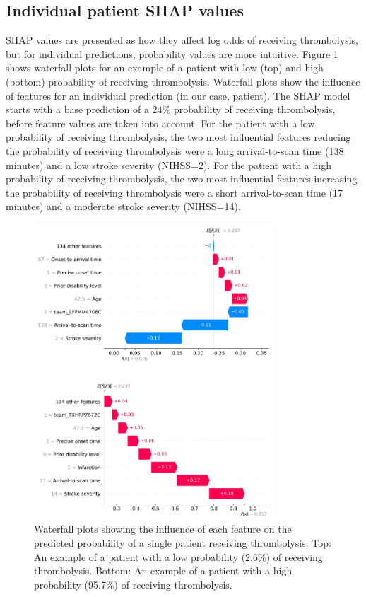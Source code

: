 \subsection{Individual patient SHAP values}
SHAP values are presented as how they affect log odds of receiving thrombolysis, but for individual predictions, probability values are more intuitive. Figure \ref{fig:results_waterfall} shows waterfall plots for an example of a patient with low (top) and high (bottom) probability of receiving thrombolysis. Waterfall plots show the influence of features for an individual prediction (in our case, patient). The SHAP model starts with a base prediction of a 24\% probability of receiving thrombolysis, before feature values are taken into account. For the patient with a low probability of receiving thrombolysis, the two most influential features reducing the probability of receiving thrombolysis were a long arrival-to-scan time (138 minutes) and a low stroke severity (NIHSS=2). For the patient with a high probability of receiving thrombolysis, the two most influential features increasing the probability of receiving thrombolysis were a short arrival-to-scan time (17 minutes) and a moderate stroke severity (NIHSS=14). 

\begin{figure}[!h]
\centering
\includegraphics[width=0.8\textwidth]{./images/waterfall}
\caption{Waterfall plots showing the influence of each feature on the predicted probability of a single patient receiving thrombolysis. Top: An example of a patient with a low probability (2.6\%) of receiving thrombolysis. Bottom: An example of a patient with a high probability (95.7\%) of receiving thrombolysis.}
\label{fig:results_waterfall}
\end{figure}


